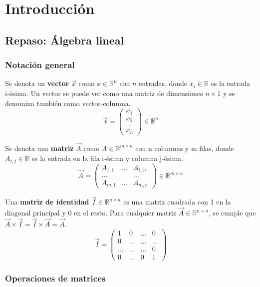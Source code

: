 \chapter{Introducción}
\section{Repaso: Álgebra lineal}
\subsection{Notación general}
Se denota un \textbf{vector} $\vec{x}$ como $x \in \mathbb{R}^n$ con $n$ entradas, donde $x_i \in \mathbb{R}$ es la entrada i-ésima. Un vector se puede ver como una matriz de dimensiones $n \times 1$ y se denomina también como vector-columna.
$$\vec{x} = \begin{pmatrix}
x_1 \\ x_2 \\ ... \\ x_n
\end{pmatrix} \in \mathbb{R}^n$$

Se denota una \textbf{matriz} $\vec{A}$ como $A \in \mathbb{R}^{m \times n}$ con n columnas y m filas, donde $A_{i,j} \in \mathbb{R}$ es la entrada en la fila i-ésima y columna j-ésima.
$$\vec{A} = \begin{pmatrix}
A_{1,1} & ... & A_{1,n} \\
... & & ...\\
A_{m,1} & ... & A_{m,n}
\end{pmatrix} \in \mathbb{R}^{m \times n}$$

Una \textbf{matriz de identidad} $\vec{I} \in \mathbb{R}^{n \times n}$ es una matriz cuadrada con 1 en la diagonal principal y 0 en el resto. Para cualquier matriz $\vec{A} \in \mathbb{R}^{n \times n}$, se cumple que $\vec{A} \times \vec{I} = \vec{I} \times \vec{A} = \vec{A}$.
$$\vec{I} = \begin{pmatrix}
1 & 0 & ... & 0 \\
0 & ... & ... & ... \\
... & ... & ... & 0 \\
0 & ... & 0 & 1
\end{pmatrix}$$

\subsection{Operaciones de matrices}

